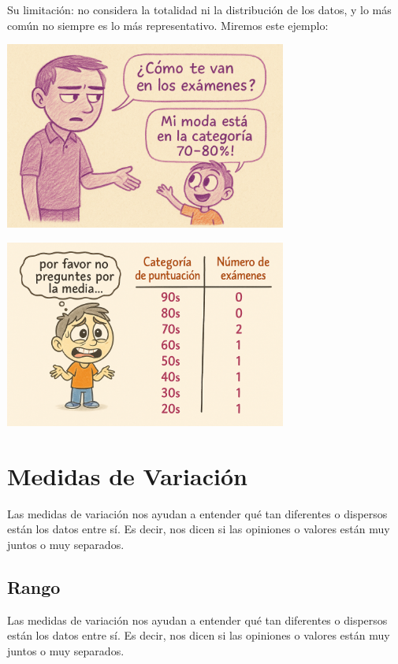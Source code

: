 \documentclass[
  spanish,
  letterpaper,
  DIV=11,
  numbers=noendperiod]{scrreprt}
\begin{document}
Su limitación: no considera la totalidad ni la distribución de los
datos, y lo más común no siempre es lo más representativo. Miremos este
ejemplo:

\begin{center}
\includegraphics[width=3.64583in,height=\textheight,keepaspectratio]{img/moda_1.png}
\end{center}

\begin{center}
\includegraphics[width=3.64583in,height=\textheight,keepaspectratio]{img/moda_2.png}
\end{center}

\section{Medidas de Variación}\label{medidas-de-variaciuxf3n}

Las medidas de variación nos ayudan a entender qué tan diferentes o
dispersos están los datos entre sí. Es decir, nos dicen si las opiniones
o valores están muy juntos o muy separados.

\subsection{Rango}\label{rango}

Las medidas de variación nos ayudan a entender qué tan diferentes o
dispersos están los datos entre sí. Es decir, nos dicen si las opiniones
o valores están muy juntos o muy separados.
\end{document}
